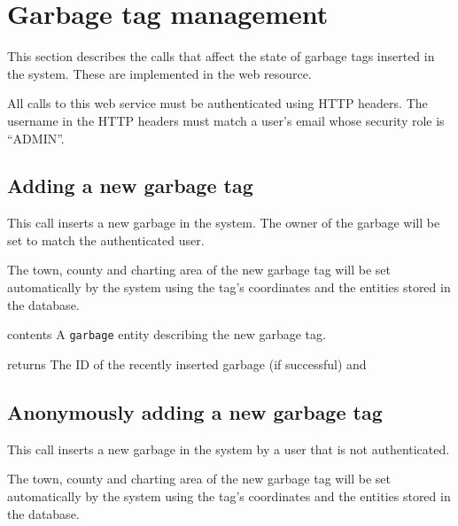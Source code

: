 \section{Garbage tag management}

This section describes the calls that affect the state of garbage tags inserted
in the system. These are implemented in the
 web
resource.

All calls to this web service must be authenticated using HTTP headers. The
username in the HTTP headers must match a user's email whose security role is
``ADMIN''.


\subsection{Adding a new garbage tag}

This call inserts a new garbage in the system. The owner of the garbage will be
set to match the authenticated user.

The town, county and charting area of the new garbage tag will be set
automatically by the system using the tag's coordinates and the entities stored
in the database.

\begin{apidata}{contents}
  A \texttt{garbage} entity describing the new garbage tag.
\end{apidata}
\begin{apidata}{returns}
  The ID of the recently inserted garbage (if successful) and
  \begin{datalist}
  \end{datalist}
\end{apidata}

\subsection{Anonymously adding a new garbage tag}

This call inserts a new garbage in the system by a user that is not
authenticated.


The town, county and charting area of the new garbage tag will be set
automatically by the system using the tag's coordinates and the entities stored
in the database.

